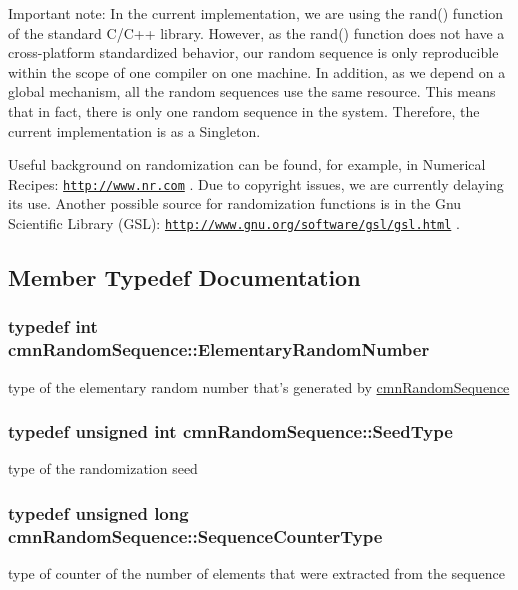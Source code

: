 Important note\-: In the current implementation, we are using the rand() function of the standard C/\-C++ library. However, as the rand() function does not have a cross-\/platform standardized behavior, our random sequence is only reproducible within the scope of one compiler on one machine. In addition, as we depend on a global mechanism, all the random sequences use the same resource. This means that in fact, there is only one random sequence in the system. Therefore, the current implementation is as a Singleton.

Useful background on randomization can be found, for example, in Numerical Recipes\-: \href{http://www.nr.com}{\tt http\-://www.\-nr.\-com} . Due to copyright issues, we are currently delaying its use. Another possible source for randomization functions is in the Gnu Scientific Library (G\-S\-L)\-: \href{http://www.gnu.org/software/gsl/gsl.html}{\tt http\-://www.\-gnu.\-org/software/gsl/gsl.\-html} . 

\subsection{Member Typedef Documentation}
\hypertarget{classcmn_random_sequence_a4728645d25009df6b70fd0db6340f92f}{
\subsubsection[{Elementary\-Random\-Number}]{\setlength{\rightskip}{0pt plus 5cm}typedef int {\bf cmn\-Random\-Sequence\-::\-Elementary\-Random\-Number}}}\label{classcmn_random_sequence_a4728645d25009df6b70fd0db6340f92f}
type of the elementary random number that's generated by \hyperlink{classcmn_random_sequence}{cmn\-Random\-Sequence} \hypertarget{classcmn_random_sequence_a7b97009536ce38559fa5fb86a9eea16d}{
\subsubsection[{Seed\-Type}]{\setlength{\rightskip}{0pt plus 5cm}typedef unsigned int {\bf cmn\-Random\-Sequence\-::\-Seed\-Type}}}\label{classcmn_random_sequence_a7b97009536ce38559fa5fb86a9eea16d}
type of the randomization seed \hypertarget{classcmn_random_sequence_ac3befd667513146020ef266429e205b0}{
\subsubsection[{Sequence\-Counter\-Type}]{\setlength{\rightskip}{0pt plus 5cm}typedef unsigned long {\bf cmn\-Random\-Sequence\-::\-Sequence\-Counter\-Type}}}\label{classcmn_random_sequence_ac3befd667513146020ef266429e205b0}
type of counter of the number of elements that were extracted from the sequence 

